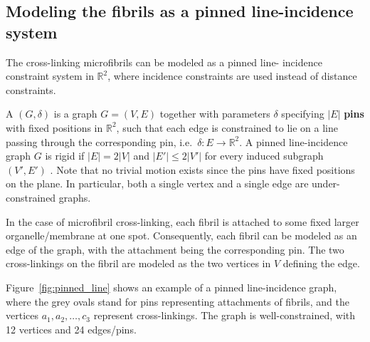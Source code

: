 \subsection{Modeling the fibrils as a pinned line-incidence system}



The cross-linking microfibrils can be modeled as a pinned line-
incidence constraint system in $\mathbb{R}^2$, where incidence
constraints are used instead of distance constraints.

A  $(G,\delta)$ is a graph $G=(V,E)$
together with parameters $\delta$ specifying $|E|$ \textbf{pins} with
fixed positions in $\mathbb{R}^2$, such that each edge is constrained
to lie on a line passing through the corresponding pin, i.e.\ $\delta:
E \rightarrow \mathbb{R}^2$.
%
%
A pinned line-incidence graph $G$ is rigid if $|E| = 2|V|$ and $|E'| \le 2|V'|$ for every induced subgraph $(V',E')$ \uncited. Note that no trivial motion exists since the pins have fixed positions on the plane.
In particular, both a single vertex and a single edge are under-constrained graphs.




In the case of microfibril cross-linking, each fibril is
attached to some fixed larger organelle/membrane at one spot.
Consequently, each fibril can be modeled as an edge of the graph,
with the attachment being the corresponding pin.
The two cross-linkings on the fibril are modeled as the two vertices in $V$ defining the edge.



Figure~\ref{fig:pinned_line} shows an example of a pinned line-incidence graph,
where the grey ovals stand for pins representing attachments of fibrils,
and the vertices $a_1,a_2,\ldots, c_3$ represent cross-linkings.
The graph is well-constrained, with 12 vertices and 24 edges/pins.

